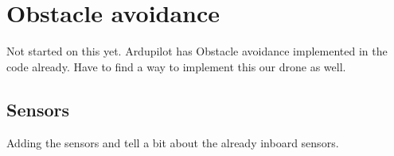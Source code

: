 \chapter{Obstacle avoidance}
Not started on this yet. Ardupilot has Obstacle avoidance implemented in the code already. Have to find a way to implement this our drone as well.

\section{Sensors}
Adding the sensors and tell a bit about the already inboard sensors. 
